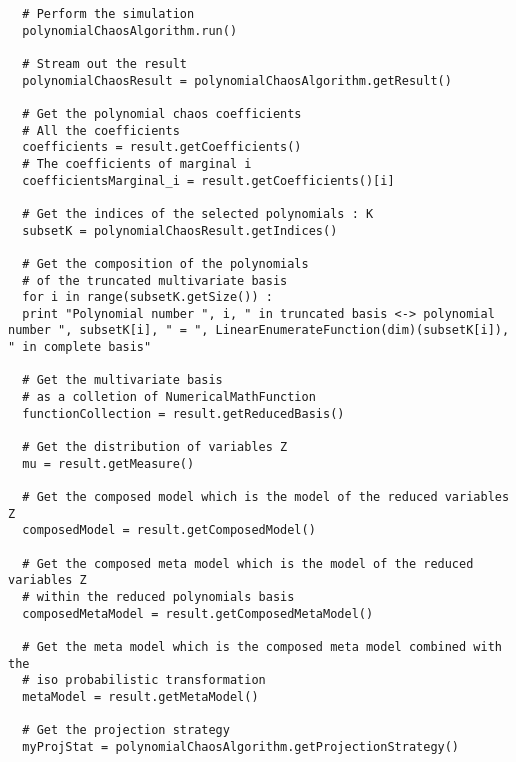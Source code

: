 \begin{lstlisting}
  # Perform the simulation
  polynomialChaosAlgorithm.run()

  # Stream out the result
  polynomialChaosResult = polynomialChaosAlgorithm.getResult()

  # Get the polynomial chaos coefficients
  # All the coefficients
  coefficients = result.getCoefficients()
  # The coefficients of marginal i
  coefficientsMarginal_i = result.getCoefficients()[i]

  # Get the indices of the selected polynomials : K
  subsetK = polynomialChaosResult.getIndices()

  # Get the composition of the polynomials
  # of the truncated multivariate basis
  for i in range(subsetK.getSize()) :
  print "Polynomial number ", i, " in truncated basis <-> polynomial number ", subsetK[i], " = ", LinearEnumerateFunction(dim)(subsetK[i]), " in complete basis"

  # Get the multivariate basis
  # as a colletion of NumericalMathFunction
  functionCollection = result.getReducedBasis()

  # Get the distribution of variables Z
  mu = result.getMeasure()

  # Get the composed model which is the model of the reduced variables Z
  composedModel = result.getComposedModel()

  # Get the composed meta model which is the model of the reduced variables Z
  # within the reduced polynomials basis
  composedMetaModel = result.getComposedMetaModel()

  # Get the meta model which is the composed meta model combined with the
  # iso probabilistic transformation
  metaModel = result.getMetaModel()

  # Get the projection strategy
  myProjStat = polynomialChaosAlgorithm.getProjectionStrategy()
\end{lstlisting}




